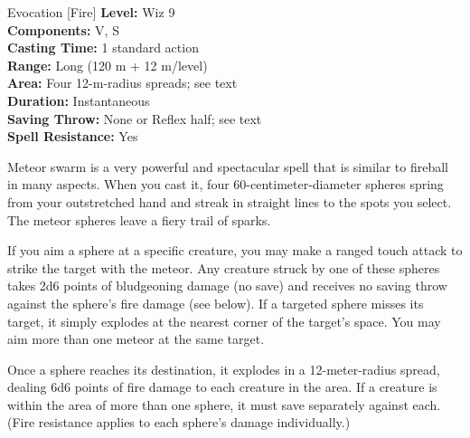 {Evocation [Fire]}
{
	\textbf{Level:}
	Wiz 9\\
	\textbf{Components:}
	V, S\\
	\textbf{Casting Time:}
	1 standard action\\
	\textbf{Range:}
	Long (120 m + 12 m/level)\\
	\textbf{Area:}
	Four 12-m-radius spreads; see text\\
	\textbf{Duration:}
	Instantaneous\\
	\textbf{Saving Throw:}
	None or Reflex half; see text\\
	\textbf{Spell Resistance:}
	Yes\\
}
{
	Meteor swarm is a very powerful and spectacular spell that is similar to fireball in many aspects. When you cast it, four 60-centimeter-diameter spheres spring from your outstretched hand and streak in straight lines to the spots you select. The meteor spheres leave a fiery trail of sparks.

	If you aim a sphere at a specific creature, you may make a ranged touch attack to strike the target with the meteor. Any creature struck by one of these spheres takes 2d6 points of bludgeoning damage (no save) and receives no saving throw against the sphere's fire damage (see below). If a targeted sphere misses its target, it simply explodes at the nearest corner of the target's space. You may aim more than one meteor at the same target.

	Once a sphere reaches its destination, it explodes in a 12-meter-radius spread, dealing 6d6 points of fire damage to each creature in the area. If a creature is within the area of more than one sphere, it must save separately against each. (Fire resistance applies to each sphere's damage individually.)

}
